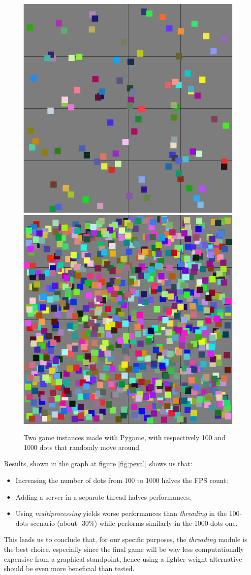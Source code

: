 \begin{figure}[h]
  \centering
  \includegraphics[width=.4\linewidth]{images/100dots.png}
  \hspace{.05\linewidth}
  \includegraphics[width=.4\linewidth]{images/1000dots.png}
  
  \caption{Two game instances made with Pygame, with respectively 100 and 1000 dots that randomly move around}
  \label{fig:randomdots}
\end{figure}

Results, shown in the graph at figure \ref{fig:peval} shows us that: 

\begin{itemize}
    \item Increasing the number of dots from 100 to 1000 halves the FPS count;
    \item Adding a server in a separate thread halves performances;
    \item Using \textit{multiprocessing} yields worse performances than \textit{threading} in the 100-dots scenario (about -30\%) while performs similarly in the 1000-dots one.
\end{itemize}

This leads us to conclude that, for our specific purposes, the \textit{threading} module is the best choice, especially since the final game will be way less computationally expensive from a graphical standpoint, hence using a lighter weight alternative should be even more beneficial than tested.

